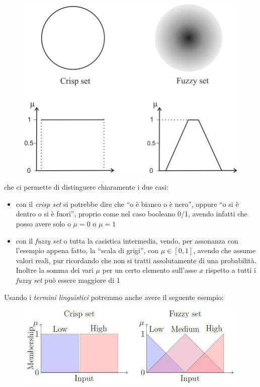 \documentclass[a4paper,12pt, oneside]{book}
\begin{document}
\begin{figure}[H]
  \centering
  \includegraphics[scale = 1.2]{img/cri.png}
\end{figure}
che ci permette di distinguere chiaramente i due casi:
\begin{itemize}
  \item con il \textit{crisp set} si potrebbe dire che ``o è bianco o è nero'',
  oppure ``o si è dentro o si è fuori'', proprio come nel caso booleano 0/1,
  avendo infatti che posso avere solo o $\mu=0$ o $\mu=1$
  \item con il \textit{fuzzy set} o tutta la casistica intermedia, vendo, per
  assonanza con l'esempio appena fatto, la ``scala di grigi'', con $\mu\in
  [0,1]$, avendo che assume valori reali, pur ricordando che non si tratti
  assolutamente di una probabilità. Inoltre la somma dei vari $\mu$ per un
  certo elemento sull'asse $x$ rispetto a tutti i \textit{fuzzy set} può essere
  maggiore di 1
\end{itemize}
Usando i \textit{termini linguistici} potremmo anche avere il seguente esempio:
\begin{figure}[H]
  \centering
  \includegraphics[scale = 0.5]{img/cri.jpg}
\end{figure}
\end{document}
